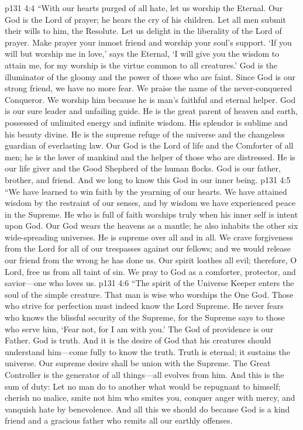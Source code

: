 \vs p131 4:4 “With our hearts purged of all hate, let us worship the Eternal. Our God is the Lord of prayer; he hears the cry of his children. Let all men submit their wills to him, the Resolute. Let us delight in the liberality of the Lord of prayer. Make prayer your inmost friend and worship your soul’s support. ‘If you will but worship me in love,’ says the Eternal, ‘I will give you the wisdom to attain me, for my worship is the virtue common to all creatures.’ God is the illuminator of the gloomy and the power of those who are faint. Since God is our strong friend, we have no more fear. We praise the name of the never\hyp{}conquered Conqueror. We worship him because he is man’s faithful and eternal helper. God is our sure leader and unfailing guide. He is the great parent of heaven and earth, possessed of unlimited energy and infinite wisdom. His splendor is sublime and his beauty divine. He is the supreme refuge of the universe and the changeless guardian of everlasting law. Our God is the Lord of life and the Comforter of all men; he is the lover of mankind and the helper of those who are distressed. He is our life giver and the Good Shepherd of the human flocks. God is our father, brother, and friend. And we long to know this God in our inner being.
\vs p131 4:5 “We have learned to win faith by the yearning of our hearts. We have attained wisdom by the restraint of our senses, and by wisdom we have experienced peace in the Supreme. He who is full of faith worships truly when his inner self is intent upon God. Our God wears the heavens as a mantle; he also inhabits the other six wide\hyp{}spreading universes. He is supreme over all and in all. We crave forgiveness from the Lord for all of our trespasses against our fellows; and we would release our friend from the wrong he has done us. Our spirit loathes all evil; therefore, O Lord, free us from all taint of sin. We pray to God as a comforter, protector, and savior---one who loves us.
\vs p131 4:6 “The spirit of the Universe Keeper enters the soul of the simple creature. That man is wise who worships the One God. Those who strive for perfection must indeed know the Lord Supreme. He never fears who knows the blissful security of the Supreme, for the Supreme says to those who serve him, ‘Fear not, for I am with you.’ The God of providence is our Father. God is truth. And it is the desire of God that his creatures should understand him---come fully to know the truth. Truth is eternal; it sustains the universe. Our supreme desire shall be union with the Supreme. The Great Controller is the generator of all things---all evolves from him. And this is the sum of duty: Let no man do to another what would be repugnant to himself; cherish no malice, smite not him who smites you, conquer anger with mercy, and vanquish hate by benevolence. And all this we should do because God is a kind friend and a gracious father who remits all our earthly offenses.\plusone
